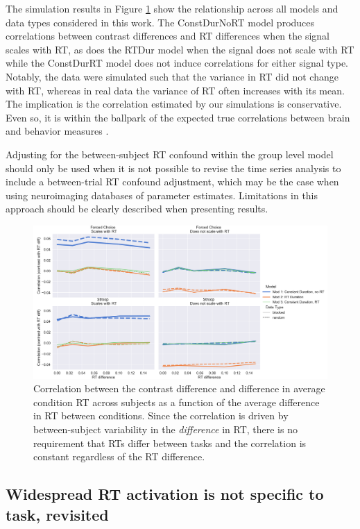 \documentclass[titlepage,12pt] {article}
\begin{document}
The simulation results in Figure \ref{fig:rt-cor} show the relationship across all models and data types considered in this work. The ConstDurNoRT model produces correlations between contrast differences and RT differences when the signal scales with RT, as does the RTDur model when the signal does not scale with RT while the ConstDurRT model does not induce correlations for either signal type.  Notably, the data were simulated such that the variance in RT did not change with RT, whereas in real data the variance of RT often increases with its mean.  The implication is the correlation estimated by our simulations is conservative.  Even so, it is within the ballpark of the expected true correlations between brain and behavior measures \citep{marekReproducibleBrainwideAssociation2022}.  

Adjusting for the between-subject RT confound within the group level model should only be used when it is not possible to revise the time series analysis to include a between-trial RT confound adjustment, which may be the case when using neuroimaging databases of parameter estimates.  Limitations in this approach should be clearly described when presenting results.


\begin{figure}
  \centering
   \includegraphics[width=5in]{Figures/cor_with_rt.pdf}
   \caption{Correlation between the contrast difference and difference in average condition RT across subjects as a function of the average difference in RT between conditions.  Since the correlation is driven by between-subject variability in the \emph{difference} in RT, there is no requirement that RTs differ between tasks and the correlation is constant regardless of the RT difference. }
  \label{fig:rt-cor}
\end{figure}




\subsection*{Widespread RT activation is not specific to task, revisited}
\end{document}
